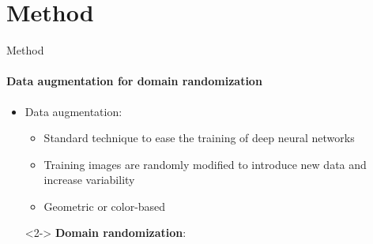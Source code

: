\documentclass[aspectratio=141]{beamer}
\begin{document}
\section{Method}

\begin{frame}{Method}
    \framesubtitle{Data augmentation for domain randomization}
    \begin{overlayarea}{\textwidth}{12cm}
    \begin{itemize}
        \item<1-> \alert{Data augmentation}:
        \begin{itemize}
            \item Standard technique to ease the training of deep neural networks
            \item Training images are randomly modified to introduce new data and increase variability
            \item Geometric or color-based
        \end{itemize}
        \item[\contour{DEgreen}{$\Rightarrow$}]<2-> \alert{\textbf{Domain randomization}}:

\end{itemize}
\end{overlayarea}
\end{frame}
\end{document}
